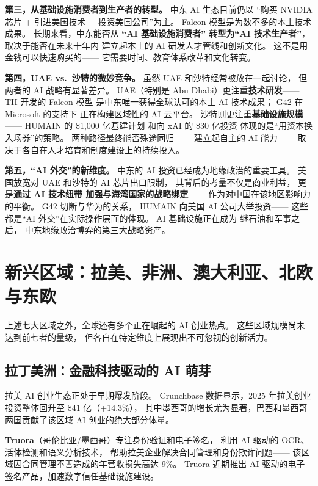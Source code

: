 \textbf{第三，从基础设施消费者到生产者的转型。}
中东 AI 生态目前仍以
``购买 NVIDIA 芯片 + 引进美国技术 + 投资美国公司''为主。
Falcon 模型是为数不多的本土技术成果。
长期来看，中东能否从
\textbf{``AI 基础设施消费者''
转型为``AI 技术生产者''}，
取决于能否在未来十年内
建立起本土的 AI 研发人才管线和创新文化。
这不是用金钱可以快速购买的——
它需要时间、教育体系改革和文化转变。

\textbf{第四，UAE vs.\ 沙特的微妙竞争。}
虽然 UAE 和沙特经常被放在一起讨论，
但两者的 AI 战略有显著差异。
UAE（特别是 Abu Dhabi）更注重\textbf{技术研发}——
TII 开发的 Falcon 模型
是中东唯一获得全球认可的本土 AI 技术成果；
G42 在 Microsoft 的支持下
正在构建区域性的 AI 云平台。
沙特则更注重\textbf{基础设施规模}——
HUMAIN 的 \$1,000 亿基建计划
和向 xAI 的 \$30 亿投资
体现的是``用资本换入场券''的策略。
两种路径最终能否殊途同归——
建立起自主的 AI 能力——
取决于各自在人才培育和制度建设上的持续投入。

\textbf{第五，``AI 外交''的新维度。}
中东的 AI 投资已经成为地缘政治的重要工具。
美国放宽对 UAE 和沙特的 AI 芯片出口限制，
其背后的考量不仅是商业利益，
更是\textbf{通过 AI 技术纽带
加强与海湾国家的战略绑定}——
作为对中国在该地区影响力的平衡。
G42 切断与华为的关系，
HUMAIN 向美国 AI 公司大举投资——
这些都是``AI 外交''在实际操作层面的体现。
AI 基础设施正在成为
继石油和军事之后，
中东地缘政治博弈的第三大战略资产。


\section{新兴区域：拉美、非洲、澳大利亚、北欧与东欧}
\label{sec:global-emerging}

上述七大区域之外，全球还有多个正在崛起的 AI 创业热点。
这些区域规模尚未达到前七者的量级，
但各自在特定维度上展现出不可忽视的创新活力。

\subsection{拉丁美洲：金融科技驱动的 AI 萌芽}

拉美 AI 创业生态正处于早期爆发阶段。
Crunchbase 数据显示，2025 年拉美创业投资整体回升至 \$41 亿（+14.3\%），
其中墨西哥的增长尤为显著，巴西和墨西哥两国贡献了该区域 AI 创业的绝大部分体量。

\textbf{Truora}（哥伦比亚/墨西哥）专注身份验证和电子签名，
利用 AI 驱动的 OCR、活体检测和语义分析技术，
帮助拉美企业解决合同管理和身份欺诈问题——
该区域因合同管理不善造成的年营收损失高达 9\%。
Truora 近期推出 AI 驱动的电子签名产品，加速数字信任基础设施建设。

